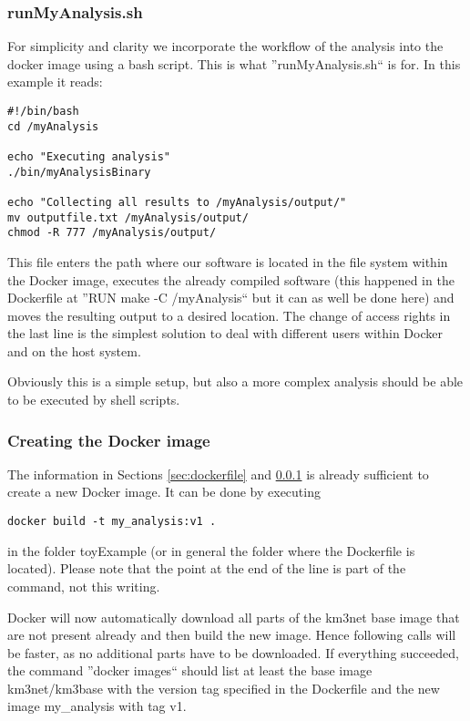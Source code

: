 \documentclass[a4paper, twoside, 11pt]{article}
\begin{document}
\subsubsection{runMyAnalysis.sh}
\label{sec:runmyanalysis}
For simplicity and clarity we incorporate the workflow of the analysis into the docker image using a bash script. 
This is what ''runMyAnalysis.sh`` is for. In this example it reads:
\begin{lstlisting}[basicstyle=\footnotesize\ttfamily,frame=single]
#!/bin/bash
cd /myAnalysis

echo "Executing analysis"
./bin/myAnalysisBinary

echo "Collecting all results to /myAnalysis/output/"
mv outputfile.txt /myAnalysis/output/
chmod -R 777 /myAnalysis/output/
\end{lstlisting}
This file enters the path where our software is located in 
the file system within the Docker image, 
executes the already compiled software 
(this happened in the Dockerfile at ''RUN make -C /myAnalysis`` but it can as well be done here) 
and moves the resulting output to a desired location.
The change of access rights in the last line is the simplest solution 
to deal with different users within Docker and on the host system. 

Obviously this is a simple setup, but also a more complex analysis should be able to be executed by shell scripts. 

\subsubsection{Creating the Docker image}
\label{sec:createImage}
The information in Sections \ref{sec:dockerfile} and \ref{sec:runmyanalysis} 
is already sufficient to create a new Docker image. 
It can be done by executing
\begin{lstlisting}[basicstyle=\footnotesize\ttfamily,frame=single]
docker build -t my_analysis:v1 .
\end{lstlisting}
in the folder toyExample (or in general the folder where the Dockerfile is located). 
Please note that the point at the end of the line is part of the command, not this writing. 

Docker will now automatically download all parts of the km3net base image 
that are not present already and then build the new image. 
Hence following calls will be faster, as no additional parts have to be downloaded. 
If everything succeeded, the command ''docker images`` 
should list at least the base image km3net/km3base 
with the version tag specified in the Dockerfile and 
the new image my\_analysis with tag v1. 
\end{document}
